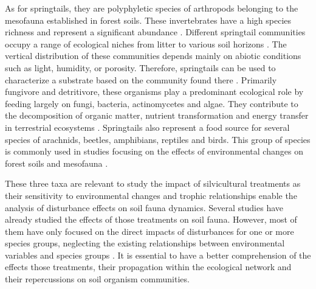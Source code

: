 As for springtails, they are polyphyletic species of arthropods belonging to the mesofauna established in forest soils. 
These invertebrates have a high species richness and represent a significant abundance \citep{rusekBiodiversityCollembolaTheir1998}. 
Different springtail communities occupy a range of ecological niches from litter to various soil horizons \citep{pongeVerticalDistributionCollembola2000}.
The vertical distribution of these communities depends mainly on abiotic conditions such as light, humidity, or porosity. 
Therefore, springtails can be used to characterize a substrate based on the community found there \citep{rusekBiodiversityCollembolaTheir1998}. 
Primarily fungivore and detritivore, these organisms play a predominant ecological role by feeding largely on fungi, bacteria, actinomycetes and algae. 
They contribute to the decomposition of organic matter, nutrient transformation and energy transfer in terrestrial ecosystems \citep{Cuchta2019importantrole,Hattenschwiler2005Biodiversitylitter,Marsden2020Howagroforestry,Petersen2000Collembolapopulations,rusekBiodiversityCollembolaTheir1998,Wolters1991SoilInvertebrates}. 
Springtails also represent a food source for several species of arachnids, beetles, amphibians, reptiles and birds. 
This group of species is commonly used in studies focusing on the effects of environmental changes on forest soils and mesofauna \citep{farskaManagementIntensityAffects2014,rousseauWoodyBiomassRemoval2019,Salmon2008Relationshipssoil}.

These three taxa are relevant to study the impact of silvicultural treatments as their sensitivity to environmental changes and trophic relationships enable the analysis of disturbance effects on soil fauna dynamics.
Several studies have already studied the effects of those treatments on soil fauna.
However, most of them have only focused on the direct impacts of disturbances for one or more species groups, neglecting the existing relationships between environmental variables and species groups \citep{josephIntegratingOccupancyModels2016,Kudrin2023metaanalysiseffects,Pollierer2021Diversityfunctional}. 
It is essential to have a better comprehension of the effects those treatments, their propagation within the ecological network and their repercussions on soil organism communities.

